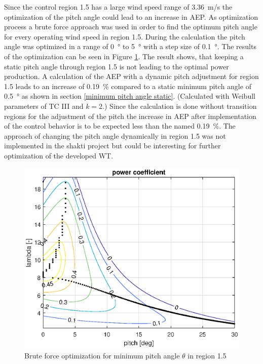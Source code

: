 Since the control region 1.5 has a large wind speed range of \SI{3.36}{m/s} the optimization of the pitch angle could lead to an increase in AEP.
As optimization process a brute force approach was used in order to find the optimum pitch angle for every operating wind speed in region 1.5. 
During the calculation the pitch angle was optimized in a range of \SI{0}{\degree} to \SI{5}{\degree} with a step size of \SI{0.1}{\degree}. 
The results of the optimization can be seen in Figure \ref{fig:theta min dynamic}. 
The result shows, that keeping a static pitch angle through region 1.5 is not leading to the optimal power production. 
A calculation of the AEP with a dynamic pitch adjustment for region 1.5 leads to an increase of \SI{0.19}{\%} compared to a static minimum pitch angle of \SI{0.5}{\degree} as shown in section \ref{minimum pitch angle static}.
(Calculated with Weibull parameters of TC III and $k=2$.)
Since the calculation is done without transition regions for the adjustment of the pitch the increase in AEP after implementation of the control behavior is to be expected less than the named \SI{0.19}{\%}.
The approach of changing the pitch angle dynamically in region 1.5 was not implemented in the \gls{shakti} project but could be interesting for further optimization of the developed WT.  

\begin{figure}[h]
	\centering	
	\includegraphics[width=12cm]{Figures/ThetaMinOptDynamic}
	\caption{Brute force optimization for minimum pitch angle $\theta$ in region 1.5}
	\label{fig:theta min dynamic}
\end{figure}